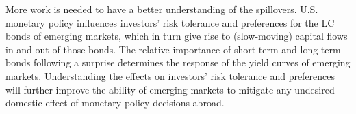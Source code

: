 {%


More work %
is needed to have a better understanding of the spillovers. 
U.S. monetary policy influences investors' risk tolerance and preferences for the LC bonds of emerging markets, which in turn give rise to (slow-moving) capital flows in and out of those bonds.
The relative importance of short-term and long-term bonds following a surprise determines the response of the yield curves of emerging markets.
Understanding the effects on investors' risk tolerance and preferences will further improve the ability of emerging markets to %
mitigate any undesired domestic effect of monetary policy decisions abroad.

}
